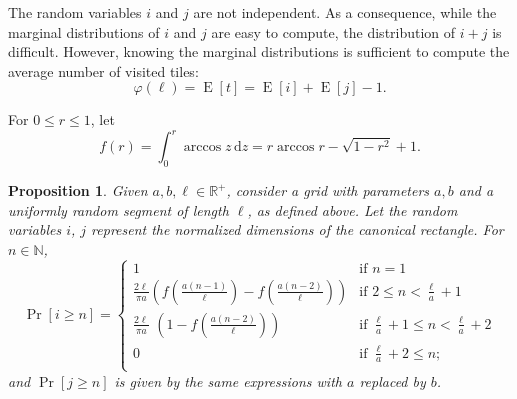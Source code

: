 \documentclass[12pt, a4paper]{article}
\newcommand{\diff}{\,\mathrm d}
\DeclareMathOperator{\E}{E}
\newcommand{\funta}{\varphi} %
\newcommand{\len}{\ell} %
\newcommand{\genvar}{r}
\newcommand{\touched}{visited}
\newtheorem{proposition}{Proposition}%
\begin{document}
The random variables $i$ and $j$ are not independent. As a consequence, while the marginal distributions of $i$ and $j$ are easy to compute, the distribution of $i+j$ is difficult. However, knowing the marginal distributions is sufficient to compute the average number of \touched{} tiles:
\begin{equation}
\label{eq: funta E[i] E[j]}
\funta(\len) = \E[t] = \E[i]+\E[j]-1.
\end{equation}

For $0 \leq \genvar \leq 1$, let
\begin{equation}
\label{eq: f}
f(\genvar) = \int_0^r \arccos z \diff z = \genvar \arccos \genvar - \sqrt{1-\genvar^2} + 1.
\end{equation}

\begin{proposition}
\label{prop: Pr i}
Given $a, b, \len \in \mathbb R^+$, consider a grid with parameters $a, b$ and a uniformly random segment of length $\len$, as defined above. Let the random variables $i$, $j$ represent the normalized dimensions of the canonical rectangle. For $n \in \mathbb N$,
\begin{equation}
\label{eq: Pr i geq n}
\Pr[i \geq n] = \begin{cases}
\displaystyle
1 &\text{if\ \ } \displaystyle n =1 \\[1 mm]
\displaystyle
\frac{2\len}{\pi a} \left(f\left(\frac{a(n-1)}{\len}\right)-f\left(\frac{a(n-2)}{\len} \right)\right) &\text{if\ \ } \displaystyle 2 \leq n < \frac \len a + 1 \\[4 mm]
\displaystyle
\frac{2\len}{\pi a}\,\, \left(1 - f\left(\frac{a(n-2)}{\len}\right)\right) &\text{if\ \ } \displaystyle \frac\len a + 1 \leq n < \frac\len a+2 \\[3 mm]
\displaystyle
0 &\text{if\ \ } \displaystyle \frac \len a + 2 \leq  n; \\
\end{cases}
\end{equation}
and $\Pr[j \geq n]$ is given by the same expressions with $a$ replaced by $b$.
\end{proposition}
\end{document}
